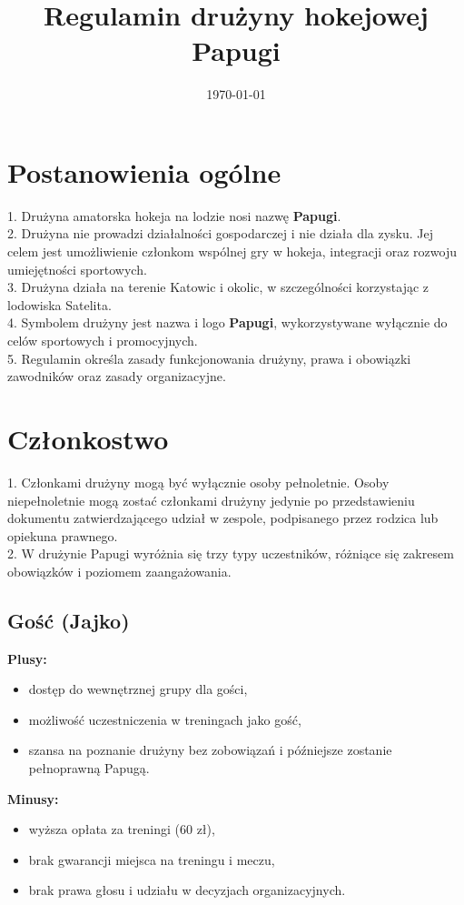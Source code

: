 \documentclass[12pt,a4paper]{article}
\title{Regulamin drużyny hokejowej Papugi}
\date{\today}
\begin{document}
\maketitle

\section{Postanowienia ogólne}
1. Drużyna amatorska hokeja na lodzie nosi nazwę \textbf{Papugi}.\\
2. Drużyna nie prowadzi działalności gospodarczej i nie działa dla zysku. Jej celem jest umożliwienie członkom wspólnej gry w hokeja, integracji oraz rozwoju umiejętności sportowych.\\
3. Drużyna działa na terenie Katowic i okolic, w szczególności korzystając z lodowiska Satelita.\\
4. Symbolem drużyny jest nazwa i logo \textbf{Papugi}, wykorzystywane wyłącznie do celów sportowych i promocyjnych.\\
5. Regulamin określa zasady funkcjonowania drużyny, prawa i obowiązki zawodników oraz zasady organizacyjne.

\section{Członkostwo}
1. Członkami drużyny mogą być wyłącznie osoby pełnoletnie. Osoby niepełnoletnie mogą zostać członkami drużyny jedynie po przedstawieniu dokumentu zatwierdzającego udział w zespole, podpisanego przez rodzica lub opiekuna prawnego.\\
2. W drużynie Papugi wyróżnia się trzy typy uczestników, różniące się zakresem obowiązków i poziomem zaangażowania. \\

\subsection{Gość (Jajko)}
\textbf{Plusy:}
\begin{itemize}
    \item dostęp do wewnętrznej grupy dla gości,
    \item możliwość uczestniczenia w treningach jako gość,
    \item szansa na poznanie drużyny bez zobowiązań i późniejsze zostanie pełnoprawną Papugą.
\end{itemize}
\textbf{Minusy:}
\begin{itemize}
    \item wyższa opłata za treningi (60 zł),
    \item brak gwarancji miejsca na treningu i meczu,
    \item brak prawa głosu i udziału w decyzjach organizacyjnych.
\end{itemize}
\end{document}
